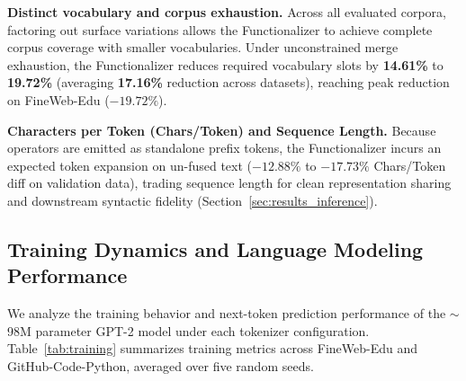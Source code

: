 \documentclass{article}
\begin{document}
\begin{table}[t]
\centering
\caption{Tokenizer Metrics under Full Corpus Exhaustion (Sampled up to 100k Documents)}
\label{tab:tokenizer_metrics}
\end{table}

\textbf{Distinct vocabulary and corpus exhaustion.} Across all evaluated corpora, factoring out surface variations allows the Functionalizer to achieve complete corpus coverage with smaller vocabularies. Under unconstrained merge exhaustion, the Functionalizer reduces required vocabulary slots by \textbf{14.61\%} to \textbf{19.72\%} (averaging \textbf{17.16\%} reduction across datasets), reaching peak reduction on FineWeb-Edu ($-19.72\%$).

\textbf{Characters per Token (Chars/Token) and Sequence Length.} Because operators are emitted as standalone prefix tokens, the Functionalizer incurs an expected token expansion on un-fused text (\textbf{$-12.88\%$} to \textbf{$-17.73\%$} Chars/Token diff on validation data), trading sequence length for clean representation sharing and downstream syntactic fidelity (Section~\ref{sec:results_inference}).

\subsection{Training Dynamics and Language Modeling Performance}\label{sec:results_training}

We analyze the training behavior and next-token prediction performance of the $\sim$98M parameter GPT-2 model under each tokenizer configuration. Table~\ref{tab:training} summarizes training metrics across FineWeb-Edu and GitHub-Code-Python, averaged over five random seeds.
\end{document}
